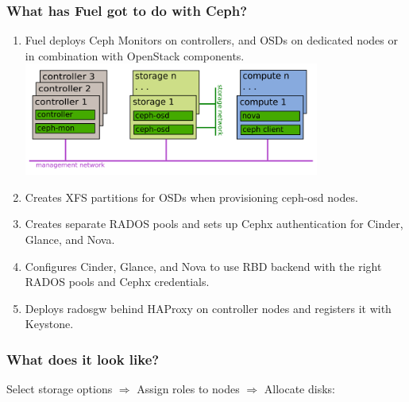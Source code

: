\documentclass[hyperref=unicode,utf8,xcolor=pst,aspectratio=169]{beamer}
\begin{document}
\begin{frame}
	\frametitle{What has Fuel got to do with Ceph?}
	\begin{enumerate}
		\item Fuel deploys Ceph Monitors on controllers, and OSDs on
			dedicated nodes or in combination with OpenStack
			components.\\
			\includegraphics[height=3.7cm]{openstack-nodes}
			\vspace{-0.3cm}
		\item Creates XFS partitions for OSDs when provisioning
			ceph-osd nodes.
		\item Creates separate RADOS pools and sets up Cephx
			authentication for Cinder, Glance, and Nova.
		\item Configures Cinder, Glance, and Nova to use RBD backend
			with the right RADOS pools and Cephx credentials.
		\item Deploys radosgw behind HAProxy on controller nodes and
			registers it with Keystone.
	\end{enumerate}
\end{frame}

\begin{frame}
	\frametitle{What does it look like?}
	Select storage options $\Rightarrow$ Assign roles to nodes $\Rightarrow$ Allocate disks:\\
\end{frame}
\end{document}
